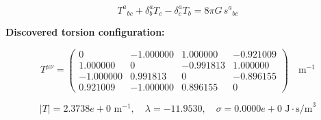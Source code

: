 
\begin{equation}
  T^a{}_{bc} + \delta^a_b T_c - \delta^a_c T_b = 8\pi G \, s^a{}_{bc}
\end{equation}

\textbf{Discovered torsion configuration:}

\begin{equation}
  T^{\mu\nu} = \begin{pmatrix}
    0 & -1.000000 & 1.000000 & -0.921009 \\
    1.000000 & 0 & -0.991813 & 1.000000 \\
    -1.000000 & 0.991813 & 0 & -0.896155 \\
    0.921009 & -1.000000 & 0.896155 & 0
  \end{pmatrix} \quad \text{m}^{-1}
\end{equation}

\begin{equation}
  |T| = 2.3738e+0 \text{ m}^{-1}, \quad
  \lambda = -11.9530, \quad
  \sigma = 0.0000e+0 \text{ J}\cdot\text{s/m}^3
\end{equation}